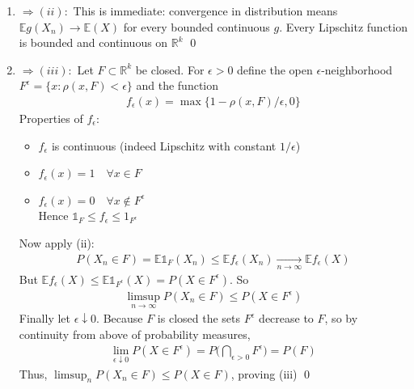 \documentclass[10pt]{article}
\begin{document}
\begin{enumerate}[label=\textit{(\roman*)}]
    \item $\Longrightarrow (ii):$ This is immediate: convergence in distribution means $\mathbb{E}g(X_n) \to \mathbb{E}(X)$ for every bounded continuous $g$. Every Lipschitz function is bounded and continuous on $\mathbb{R}^k$ \qed
    \item $\Longrightarrow (iii):$ Let $F \subset \mathbb{R}^k$ be closed. For $\epsilon > 0$ define the open $\epsilon$-neighborhood $F^\epsilon = \{x : \rho(x, F) < \epsilon\}$ and the function 
    \begin{gather*}
        f_\epsilon(x) = \max \{1 - \rho(x, F) / \epsilon, 0\}
    \end{gather*}
    Properties of $f_\epsilon$:
    \begin{itemize}
        \item $f_\epsilon$ is continuous (indeed Lipschitz with constant $1 / \epsilon$)
        \item $f_\epsilon(x) = 1 \quad\forall x \in F$
        \item $f_\epsilon(x) = 0 \quad\forall x \notin F^\epsilon$\\
        Hence $\mathbb{1}_F \leq f_\epsilon \leq 1_{F^\epsilon}$
    \end{itemize}
    Now apply (ii): 
    \begin{gather*}
        P(X_n \in F) = \mathbb{E}\mathbb{1}_F(X_n) \leq \mathbb{E}f_\epsilon(X_n) \xrightarrow[n \to \infty]{} \mathbb{E}f_\epsilon(X)
    \end{gather*}
    But $\mathbb{E}f_\epsilon(X) \leq \mathbb{E}\mathbb{1}_{F^\epsilon}(X) = P(X \in F^\epsilon)$. So 
    \begin{gather*}
        \limsup_{n \to \infty}P(X_n \in F) \leq P(X \in F^\epsilon)
    \end{gather*}
    Finally let $\epsilon \downarrow 0$. Because $F$ is closed the sets $F^\epsilon$ decrease to $F$, so by continuity from above of probability measures,
    \begin{gather*}
        \lim_{\epsilon\downarrow0}P(X \in F^\epsilon) = P\Big(\bigcap_{\epsilon > 0}F^\epsilon\Big) = P(F)
    \end{gather*}
    Thus, $\limsup_n P(X_n \in F) \leq P(X \in F)$, proving (iii) \qed

    \newpage


\end{enumerate}
\end{document}
